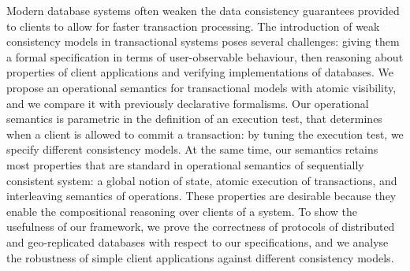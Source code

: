 %
Modern database systems often weaken the data consistency guarantees 
provided to clients to allow for faster transaction processing. 
The introduction of weak consistency models in transactional systems 
poses several challenges: giving them a formal specification in terms 
of user-observable behaviour, then reasoning about properties of client applications 
and verifying implementations of databases.
We propose an operational semantics for transactional models with  
atomic visibility, and we compare it with previously declarative formalisms. 
Our operational semantics is parametric in the definition of an execution test, 
that determines when a client is allowed to commit a transaction: 
by tuning the execution test, 
we specify different consistency models. 
At the same time, our semantics retains most properties 
that are standard in operational semantics of sequentially consistent system: 
a global notion of state, atomic execution of transactions, and interleaving 
semantics of operations. These properties are desirable because they enable 
the compositional reasoning over clients of a system.
To show the usefulness of our framework, we prove the correctness 
of protocols of distributed and geo-replicated databases with respect 
to our specifications, and we analyse the robustness of simple client applications 
against different consistency models.



